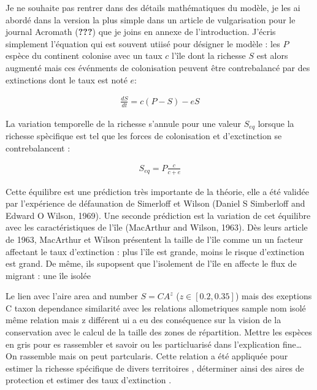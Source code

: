 Je ne souhaite pas rentrer dans des détails mathématiques du modèle, je
les ai abordé dans la version la plus simple dans un article de
vulgarisation pour le journal Acromath ({\textbf{???}}) que je joins en
annexe de l'introduction. J'écris simplement l'équation qui est souvent
utiisé pour désigner le modèle : les \(P\) espèce du continent colonise
avec un taux \(c\) l'île dont la richesse \(S\) est alors augmenté mais
ces événments de colonisation peuvent être contrebalancé par des
extinctions dont le taux est noté \(e\):

\begin{eqnarray}
\frac{dS}{dt} = c(P-S)-eS
\end{eqnarray}

La variation temporelle de la richesse s'annule pour une valeur
\(S_{eq}\) lorsque la richesse spècifique est tel que les forces de
colonisation et d'exctinction se contrebalancent :

\begin{eqnarray}
S_{eq} = P \frac{c}{c+e}
\end{eqnarray}

Cette équilibre est une prédiction très importante de la théorie, elle a
été validée par l'expérience de défaunation de Simerloff et Wilson
(Daniel S Simberloff and Edward O Wilson, 1969). Une seconde prédiction
est la variation de cet équilibre avec les caractéristiques de l'île
(MacArthur and Wilson, 1963). Dès leurs article de 1963, MacArthur et
Wilson présentent la taille de l'île comme un un facteur affectant le
taux d'extinction : plus l'île est grande, moins le risque d'extinction
est grand. De même, ils supopsent que l'isolement de l'île en affecte le
flux de migrant : une île isolée

Le lien avec l'aire area and number \(S=CA^z\) (\(z \in [0.2,0.35]\))
mais des exeptions C taxon dependance similarité avec les relations
allometriques sample nom isolé même relation mais z différent ui a eu
des conséquence sur la vision de la conservation avec le calcul de la
taille des zones de répartition. Mettre les espèces en gris pour es
rassembler et savoir ou les particluarisé dans l'explication
fine\ldots{} On rassemble mais on peut partcularis. Cette relation a été
appliquée pour estimer la richesse spécifique de divers territoires
\cite{May1988}, déterminer ainsi des aires de protection
\cite{Neigel2003,Desmet2004} et estimer des taux d'extinction
\cite{He2011}.

